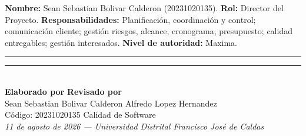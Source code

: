 \documentclass[12pt,a4paper]{article}
\begin{document}
\textbf{Nombre:} Sean Sebastian Bolivar Calderon (20231020135). \textbf{Rol:} Director del Proyecto. \textbf{Responsabilidades:} Planificación, coordinación y control; comunicación cliente; gestión riesgos, alcance, cronograma, presupuesto; calidad entregables; gestión interesados. \textbf{Nivel de autoridad:} Maxima.

\vspace{3cm}

\newpage
\vspace*{5cm}

\begin{center}
\rule{5cm}{0.5pt} \hspace{2cm} \rule{5cm}{0.5pt}\\[0.3cm]
\textbf{Elaborado por} \hspace{4.5cm} \textbf{Revisado por}\\[0.1cm]
Sean Sebastian Bolivar Calderon \hspace{3cm} Alfredo Lopez Hernandez\\[0.1cm]
Código: 20231020135 \hspace{4.0cm} Calidad de Software\\[1.5cm]
\textit{11 de agosto de 2026 --- Universidad Distrital Francisco José de Caldas}
\end{center}
\end{document}

